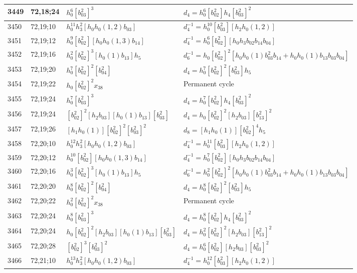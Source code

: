 \documentclass{article}
\begin{document}
\begin{longtable}{|l|l|>{\raggedright\arraybackslash}p{6cm}|>{\raggedright\arraybackslash}p{6cm}|}
3449 & 72,18;24 & $h_0^6[b_{03}^2]^3$ &$d_{4}=h_0^6[b_{02}^2]h_4[b_{03}^2]^2$\\
\hline
3450 & 72,19;10 & $h_0^{11}h_3^2[h_0h_0(1, 2)b_{03}]$ & $d_{4}^{-1}=h_0^{10}[b_{03}^2][h_2h_0(1, 2)]$\\
\hline
3451 & 72,19;12 & $h_0^9[b_{02}^2][h_0h_0(1, 3)b_{14}]$ & $d_{4}^{-1}=h_0^6[b_{02}^2][h_0h_3b_{02}b_{14}b_{04}]$\\
\hline
3452 & 72,19;16 & $h_0^2[b_{02}^2]^3[h_0(1)b_{13}]h_5$ & $d_{6}^{-1}=h_0[b_{02}^2]^2[h_0h_0(1)b_{03}^2b_{14} + h_0h_0(1)b_{13}b_{03}b_{04}]$\\
\hline
3453 & 72,19;20 & $h_0^7[b_{02}^2]^2[b_{04}^2]$ &$d_{4}=h_0^7[b_{02}^2]^2[b_{03}^2]h_5$\\
\hline
3454 & 72,19;22 & $h_0[b_{02}^2]^2x_{38}$ & Permanent cycle\\
\hline
3455 & 72,19;24 & $h_0^7[b_{03}^2]^3$ &$d_{4}=h_0^7[b_{02}^2]h_4[b_{03}^2]^2$\\
3456 & 72,19;24 & $[b_{02}^2]^2[h_2b_{03}][h_0(1)b_{13}][b_{03}^2]$ &$d_{4}=h_0[b_{02}^2]^2[h_2b_{03}][b_{13}^2]^2$\\
\hline
3457 & 72,19;26 & $[h_1h_0(1)][b_{02}^2]^2[b_{03}^2]^2$ &$d_{8}=[h_1h_0(1)][b_{02}^2]^4h_5$\\
\hline
3458 & 72,20;10 & $h_0^{12}h_3^2[h_0h_0(1, 2)b_{03}]$ & $d_{4}^{-1}=h_0^{11}[b_{03}^2][h_2h_0(1, 2)]$\\
\hline
3459 & 72,20;12 & $h_0^{10}[b_{02}^2][h_0h_0(1, 3)b_{14}]$ & $d_{4}^{-1}=h_0^7[b_{02}^2][h_0h_3b_{02}b_{14}b_{04}]$\\
\hline
3460 & 72,20;16 & $h_0^3[b_{02}^2]^3[h_0(1)b_{13}]h_5$ & $d_{6}^{-1}=h_0^2[b_{02}^2]^2[h_0h_0(1)b_{03}^2b_{14} + h_0h_0(1)b_{13}b_{03}b_{04}]$\\
\hline
3461 & 72,20;20 & $h_0^8[b_{02}^2]^2[b_{04}^2]$ &$d_{4}=h_0^8[b_{02}^2]^2[b_{03}^2]h_5$\\
\hline
3462 & 72,20;22 & $h_0^2[b_{02}^2]^2x_{38}$ & Permanent cycle\\
\hline
3463 & 72,20;24 & $h_0^8[b_{03}^2]^3$ &$d_{4}=h_0^8[b_{02}^2]h_4[b_{03}^2]^2$\\
3464 & 72,20;24 & $h_0[b_{02}^2]^2[h_2b_{03}][h_0(1)b_{13}][b_{03}^2]$ &$d_{4}=h_0^2[b_{02}^2]^2[h_2b_{03}][b_{13}^2]^2$\\
\hline
3465 & 72,20;28 & $[b_{02}^2]^3[b_{03}^2]^2$ &$d_{4}=h_0^6[b_{02}^2][h_2b_{03}][b_{03}^2]^2$\\
\hline
3466 & 72,21;10 & $h_0^{13}h_3^2[h_0h_0(1, 2)b_{03}]$ & $d_{4}^{-1}=h_0^{12}[b_{03}^2][h_2h_0(1, 2)]$\\

\end{longtable}
\end{document}
